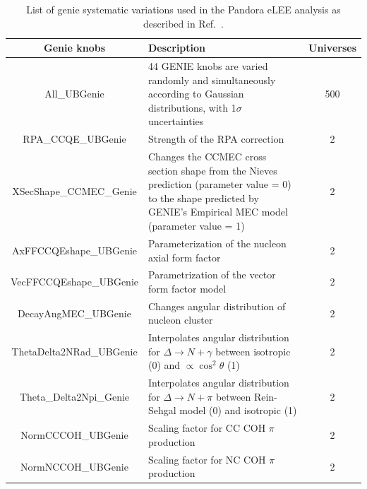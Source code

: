 \begin{table}[H]
\centering
 \begin{tabular}{| c | m{8cm} | c |} 
    \hline
\hline
Genie knobs & Description & Universes \\
\hline
All\_UBGenie      & 44 GENIE knobs are varied randomly and simultaneously according to Gaussian distributions, with 1$\sigma$ uncertainties & 500\\
RPA\_CCQE\_UBGenie      & Strength of the RPA correction & 2\\
XSecShape\_CCMEC\_Genie     &  Changes the CCMEC cross section shape from the Nieves prediction (parameter value = 0) to the shape predicted by GENIE’s Empirical MEC model (parameter value = 1) & 2\\ 
AxFFCCQEshape\_UBGenie   &  Parameterization of the nucleon axial form factor & 2\\
VecFFCCQEshape\_UBGenie      &  Parametrization of the vector form factor model & 2\\  
DecayAngMEC\_UBGenie       & Changes angular distribution of nucleon cluster  & 2\\ 
ThetaDelta2NRad\_UBGenie   &  Interpolates angular distribution for $\Delta\to N+\gamma$ between isotropic (0) and $\propto \cos^2 \theta$  (1) & 2\\ 
Theta\_Delta2Npi\_Genie       &  Interpolates angular distribution for $\Delta\to N+\pi$ between Rein-Sehgal model (0) and isotropic (1) & 2\\ 
NormCCCOH\_UBGenie       &  Scaling factor for CC COH $\pi$ production & 2\\ 
NormNCCOH\_UBGenie      &  Scaling factor for NC COH $\pi$ production  & 2\\ 
\hline
\end{tabular}
\caption{List of genie systematic variations used in the Pandora eLEE analysis as described in Ref.~\cite{bib:geniesupportnote}.}
\label{tab:geniesyst}
\end{table}

